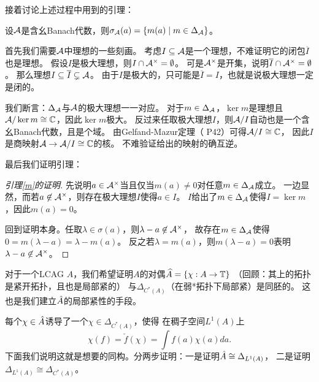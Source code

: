 接着讨论上述过程中用到的引理：
\begin{lemma}\label{m}
    设$\mathcal{A}$是含幺Banach代数，则$\sigma_{\mathcal{A}}(a) = \{m(a) \mid m \in \Delta_{\mathcal{A}}\}$。
\end{lemma}

首先我们需要$\mathcal{A}$中理想的一些刻画。
考虑$I \subseteq \mathcal{A}$是一个理想，不难证明它的闭包$\overline{I}$也是理想。
假设$I$是极大理想，则$I \cap \mathcal{A}^\times = \emptyset$。
可是$\mathcal{A}^\times$是开集，说明$\overline{I} \cap \mathcal{A}^\times = \emptyset$。
那么理想$I \subseteq \overline{I} \subsetneq \mathcal{A}$。
由于$I$是极大的，只可能是$\overline{I} = I$，也就是说极大理想一定是闭的。

我们断言：$\Delta_{\mathcal{A}}$与$\mathcal{A}$的极大理想一一对应。
对于$m \in \Delta_{\mathcal{A}}$，$\ker m$是理想且$\mathcal{A}/\ker m \cong \mathbb{C}$，因此$\ker m$极大。
反过来任取极大理想$I$，则$\mathcal{A}/I$自动也是一个含幺Banach代数，且是个域。
由Gelfand-Mazur定理（\cite{Pr} P42）可得$\mathcal{A}/I \cong \mathbb{C}$，
因此$I$是商映射$\mathcal{A} \to \mathcal{A}/I \cong \mathbb{C}$的核。
不难验证给出的映射的确互逆。

最后我们证明引理：
\begin{proof}[引理\ref{m}的证明]
    先说明$a \in \mathcal{A}^\times$当且仅当$m(a) \neq 0$对任意$m \in \Delta_{\mathcal{A}}$成立。
    一边显然，而若$a \not\in \mathcal{A}^\times$，则存在极大理想$I$使得$a \in I$。
    $I$给出了$m \in \Delta_{\mathcal{A}}$使得$I  =\ker m$，因此$m(a) = 0$。

    回到证明本身。任取$\lambda \in \sigma(a)$，则$\lambda-a \not\in \mathcal{A}^\times$，
    故存在$m \in \Delta_{\mathcal{A}}$使得$0 = m(\lambda-a) = \lambda -m(a)$。
    反之若$\lambda = m(a)$，则$m(\lambda-a) = 0$表明
    $\lambda-a \not\in \mathcal{A}^\times$。
\end{proof}

对于一个LCAG $A$，我们希望证明$A$的对偶$\widehat{A} = \{\chi:A \to \mathbb{T}\}$
（回顾：其上的拓扑是紧开拓扑，且也是局部紧的）
与$\Delta_{C^*(A)}$（在弱*拓扑下局部紧）是同胚的。
这也是我们建立$\hat{A}$的局部紧性的手段。

每个$\chi \in \hat{A}$诱导了一个$\chi \in \Delta_{C^*(A)}$，使得
在稠子空间$L^1(A)$上\[\chi(f) = \check{f}(\chi) = \int f(a)\chi(a) da.\]
下面我们说明这就是想要的同构。分两步证明：一是证明$\hat{A} \cong \Delta_{L^1(A)}$，
二是证明$\Delta_{L^1(A)} \cong \Delta_{C^*(A)}$。

